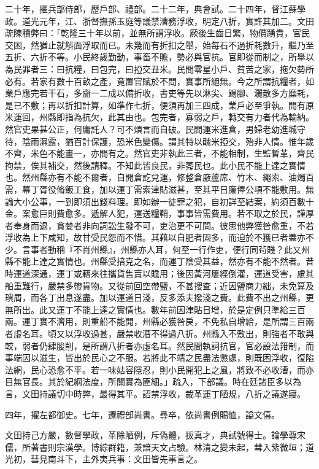 \begin{pinyinscope}
二十年，擢兵部侍郎，歷戶部、禮部。二十二年，典會試。二十四年，督江蘇學政。道光元年，江、浙督撫孫玉庭等議禁漕務浮收，明定八折，實許其加二。文田疏陳積弊曰：「乾隆三十年以前，並無所謂浮收。厥後生齒日繁，物價踴貴，官民交困，然猶止就斛面浮取而已。未幾而有折扣之舉，始每石不過折耗數升，繼乃至五折、六折不等。小民終歲勤動，事畜不贍，勢必與官抗。官即從而制之，所舉以為民罪者三：曰抗糧，曰包完，曰掗交丑米。民間零星小戶、貧苦之家，拖欠勢所必有。若家有數十百畝之產，竟置官賦於不問，實事所絕無。今之所謂抗糧者，如業戶應完若干石，多齎一二成以備折收，書吏等先以淋尖、踢腳、灑散多方糜耗，是已不敷；再以折扣計算，如準作七折，便須再加三四成，業戶必至爭執。間有原米運回，州縣即指為抗欠，此其由也。包完者，寡弱之戶，轉交有力者代為輸納。然官吏果甚公正，何庸託人？可不煩言而自破。民間運米進倉，男婦老幼進城守待，陰雨濕露，猶百計保護，恐米色變傷。謂其特以醜米掗交，殆非人情。惟年歲不齊，米色不能畫一，亦間有之。然官吏非執此三者，不能相制，生監暫革，齊民拘禁，俟其補交，然後請釋。不知此皆良民，非莠民也。此小民不能上達之實情也。然州縣亦有不能不爾者，自開倉訖兌運，修整倉廒蘆席、竹木、繩索、油燭百需，幕丁胥役脩飯工食，加以運丁需索津貼滋甚，至其平日廉俸公項不能敷用。無論大小公事，一到即須出錢料理。即如辦一徒罪之犯，自初詳至結案，約須百數十金。案愈巨則費愈多。遞解人犯，運送糧鞘，事事皆需費用。若不取之於民，謹厚者奉身而退，貪婪者非向詞訟生發不可，吏治更不可問。彼思他弊獲咎愈重，不若浮收為上下咸知，故甘受民怨而不惜。其藉以自肥者固多，而迫於不獲已者蓋亦不少。言事者動稱『不肖州縣』，州縣亦人耳，何至一行作吏，便行同茍賤？此又州縣不能上達之實情也。州縣受掊克之名，而運丁陰受其益，然亦有不能不然者。昔時運道深通，運丁或藉來往攜貨售賣以贍用；後因黃河屢經倒灌，運道受害，慮其船重難行，嚴禁多帶貨物。又從前回空帶鹽，不甚搜查；近因鹽商力絀，未免算及瑣屑，而各丁出息遂盡。加以運道日淺，反多添夫撥淺之費。此費不出之州縣，更無所出。此又運丁不能上達之實情也。數年前因津貼日增，於是定例只準給三百兩。運丁實不濟用，則重船不能開，州縣必獲咎戾，不免私自增給，是所謂三百兩者虛名耳。頃又以浮收過甚，嚴禁收漕不得過八折。州縣入不敷出，則強者不敢與較，弱者仍肆朘削，是所謂八折者亦虛名耳。然民間執詞抗官，官必設法箝制，而事端因以滋生，皆出於民心之不服。若將此不靖之民盡法懲處，則既困浮收，復陷法網，民心恐愈不平。若一味姑容隱忍，則小民開犯上之風，將致不必收漕，而亦目無官長。其於紀綱法度，所關實為匪細。」疏入，下部議。時在廷諸臣多以為言，文田持議切中時弊，最得其平。詔禁浮收，裁革運丁陋規，八折之議遂寢。

四年，擢左都御史。七年，遷禮部尚書。尋卒，依尚書例賜恤，謚文僖。

文田持己方嚴，數督學政，革除陋例，斥偽體，拔真才，典試號得士。論學尊宋儒，所著書則宗漢學。博綜群籍，兼諳天文占驗。林清之變未起，彗入紫微垣；道光初，彗見南斗下，主外夷兵事：文田皆先事言之。


\end{pinyinscope}
